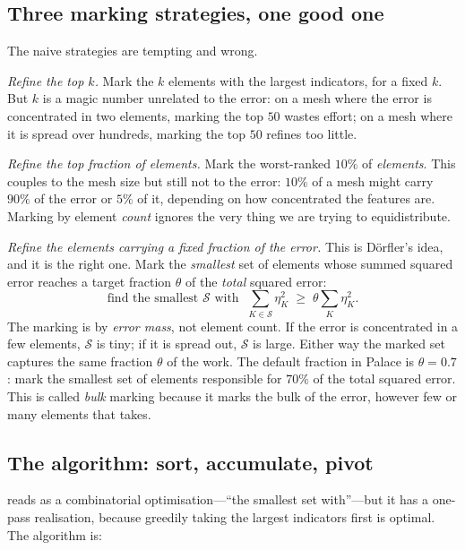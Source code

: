 \subsection{Three marking strategies, one good one}

The naive strategies are tempting and wrong.

\emph{Refine the top $k$.} Mark the $k$ elements with the largest indicators, for a
fixed $k$. But $k$ is a magic number unrelated to the error: on a mesh where the
error is concentrated in two elements, marking the top $50$ wastes effort; on a mesh
where it is spread over hundreds, marking the top $50$ refines too little.

\emph{Refine the top fraction of elements.} Mark the worst-ranked $10\%$ of
\emph{elements}. This couples to the mesh size but still not to the error: $10\%$ of a
mesh might carry $90\%$ of the error or $5\%$ of it, depending on how concentrated the
features are. Marking by element \emph{count} ignores the very thing we are trying to
equidistribute.

\emph{Refine the elements carrying a fixed fraction of the error.} This is
D\"orfler's idea, and it is the right one. Mark the \emph{smallest} set of elements
whose summed squared error reaches a target fraction $\theta$ of the \emph{total}
squared error:
\begin{equation}
\boxed{\;
\text{find the smallest } \mathcal{S} \text{ with } \;
\sum_{K \in \mathcal{S}} \eta_K^2 \;\ge\; \theta \sum_{K} \eta_K^2.
\;}
\label{eq:dorfler}
\end{equation}
The marking is by \emph{error mass}, not element count. If the error is concentrated
in a few elements, $\mathcal{S}$ is tiny; if it is spread out, $\mathcal{S}$ is large.
Either way the marked set captures the same fraction $\theta$ of the work. The
default fraction in Palace is $\theta = 0.7$: mark the smallest set of elements
responsible for $70\%$ of the total squared error. This is called \emph{bulk}
marking because it marks the bulk of the error, however few or many elements that
takes.

\subsection{The algorithm: sort, accumulate, pivot}

 reads as a combinatorial optimisation---``the smallest set
with''---but it has a one-pass realisation, because greedily taking the largest
indicators first is optimal. The algorithm is:


